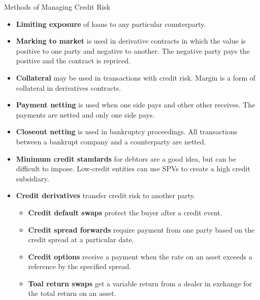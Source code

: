 \documentclass[../custom,grid]{flashcards}
\newcommand{\studyArea}{Risk Management}
\begin{document}
\begin{flashcard}[\studyArea]{Methods of Managing Credit Risk}
    \begin{itemize}[itemsep=1pt,parsep=1pt]
        \item \textbf{Limiting exposure} of loans to any particular counterparty.
        \item \textbf{Marking to market} is used in derivative contracts in which the value is positive to one party and negative to another. The negative party pays the positive and the contract is repriced.
        \item \textbf{Collateral} may be used in transactions with credit risk. Margin is a form of collateral in derivatives contracts.
        \item \textbf{Payment netting} is used when one side pays and other other receives. The payments are netted and only one side pays.
        \item \textbf{Closeout netting} is used in bankruptcy proceedings. All transactions between a bankrupt company and a counterparty are netted.
        \item \textbf{Minimum credit standards} for debtors are a good idea, but can be difficult to impose. Low-credit entities can use SPVs to create a high credit subsidiary.
        \item \textbf{Credit derivatives} transfer credit risk to another party.
        \begin{itemize}
            \item \textbf{Credit default swaps} protect the buyer after a credit event.
            \item \textbf{Credit spread forwards} require payment from one party based on the credit spread at a particular date. 
            \item \textbf{Credit options} receive a payment when the rate on an asset exceeds a reference by the specified spread.
            \item \textbf{Toal return swaps} get a variable return from a dealer in exchange for the total return on an asset.
        \end{itemize}
    \end{itemize}
\end{flashcard}
\end{document}
